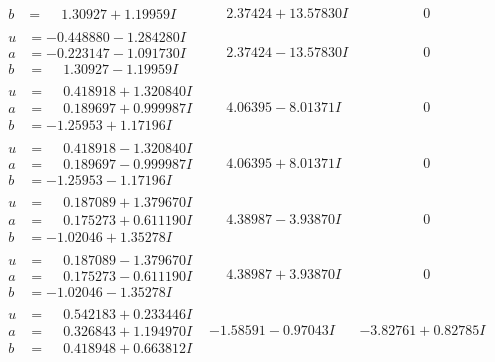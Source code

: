 \documentclass[1p]{elsarticle_modified}
\theoremstyle{definition}
\begin{document}
$$\begin{array}{c|c|c}
\begin{aligned}
b &= \phantom{-}1.30927 + 1.19959 I\end{aligned}
 & \phantom{-}2.37424 + 13.57830 I & \phantom{-0.000000 } 0 \\ \hline\begin{aligned}
u &= -0.448880 - 1.284280 I \\
a &= -0.223147 - 1.091730 I \\
b &= \phantom{-}1.30927 - 1.19959 I\end{aligned}
 & \phantom{-}2.37424 - 13.57830 I & \phantom{-0.000000 } 0 \\ \hline\begin{aligned}
u &= \phantom{-}0.418918 + 1.320840 I \\
a &= \phantom{-}0.189697 + 0.999987 I \\
b &= -1.25953 + 1.17196 I\end{aligned}
 & \phantom{-}4.06395 - 8.01371 I & \phantom{-0.000000 } 0 \\ \hline\begin{aligned}
u &= \phantom{-}0.418918 - 1.320840 I \\
a &= \phantom{-}0.189697 - 0.999987 I \\
b &= -1.25953 - 1.17196 I\end{aligned}
 & \phantom{-}4.06395 + 8.01371 I & \phantom{-0.000000 } 0 \\ \hline\begin{aligned}
u &= \phantom{-}0.187089 + 1.379670 I \\
a &= \phantom{-}0.175273 + 0.611190 I \\
b &= -1.02046 + 1.35278 I\end{aligned}
 & \phantom{-}4.38987 - 3.93870 I & \phantom{-0.000000 } 0 \\ \hline\begin{aligned}
u &= \phantom{-}0.187089 - 1.379670 I \\
a &= \phantom{-}0.175273 - 0.611190 I \\
b &= -1.02046 - 1.35278 I\end{aligned}
 & \phantom{-}4.38987 + 3.93870 I & \phantom{-0.000000 } 0 \\ \hline\begin{aligned}
u &= \phantom{-}0.542183 + 0.233446 I \\
a &= \phantom{-}0.326843 + 1.194970 I \\
b &= \phantom{-}0.418948 + 0.663812 I\end{aligned}
 & -1.58591 - 0.97043 I & -3.82761 + 0.82785 I \\ \hline\begin{aligned}

\end{aligned}
\end{array}$$
\end{document}
